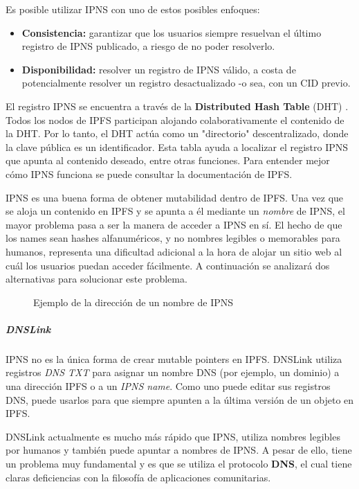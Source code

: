 Es posible utilizar IPNS con uno de estos posibles enfoques:
\begin{itemize}
    \item \textbf{Consistencia:} garantizar que los usuarios siempre resuelvan el último registro de IPNS publicado, a riesgo de no poder resolverlo.
    \item \textbf{Disponibilidad:} resolver un registro de IPNS válido, a costa de potencialmente resolver un registro desactualizado -o sea, con un CID previo.
\end{itemize}

El registro IPNS se encuentra a través de la \textbf{Distributed Hash Table} (DHT) \cite{dht}. Todos los nodos de IPFS participan alojando colaborativamente el contenido de la DHT. Por lo tanto, el DHT actúa como un "directorio" descentralizado, donde la clave pública es un identificador. Esta tabla ayuda a localizar el registro IPNS que apunta al contenido deseado, entre otras funciones. Para entender mejor cómo IPNS funciona se puede consultar la documentación de IPFS.

IPNS es una buena forma de obtener mutabilidad dentro de IPFS. Una vez que se aloja un contenido en IPFS y se apunta a él mediante un \textit{nombre} de IPNS, el mayor problema pasa a ser la manera de acceder a IPNS en sí. El hecho de que los names sean hashes alfanuméricos, y no nombres legibles o memorables para humanos, representa una dificultad adicional a la hora de alojar un sitio web al cuál los usuarios puedan acceder fácilmente. A continuación se analizará dos alternativas para solucionar este problema.

\begin{figure}[h]
\centering
{}
\caption{Ejemplo de la dirección de un nombre de IPNS}
\end{figure}

\subparagraph{DNSLink}

IPNS no es la única forma de crear mutable pointers en IPFS. DNSLink \cite{dnslink} utiliza registros \textit{DNS TXT} para asignar un nombre DNS (por ejemplo, un dominio) a una dirección IPFS o a un \textit{IPNS name}. Como uno puede editar sus registros DNS, puede usarlos para que siempre apunten a la última versión de un objeto en IPFS.

DNSLink actualmente es mucho más rápido que IPNS, utiliza nombres legibles por humanos y también puede apuntar a nombres de IPNS. A pesar de ello, tiene un problema muy fundamental y es que se utiliza el protocolo \textbf{DNS}, el cual tiene claras deficiencias con la filosofía de aplicaciones comunitarias.

